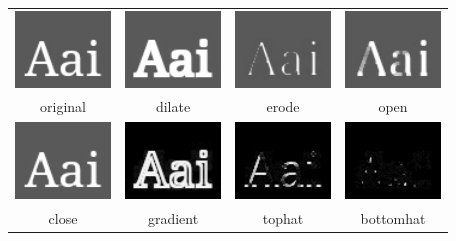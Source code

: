 \begin{tabular}{cccc}
\includegraphics[width=1.0in]{figures/morphsource.jpg} &
\includegraphics[width=1.0in]{figures/dilate.jpg} &
\includegraphics[width=1.0in]{figures/erode.jpg} &
\includegraphics[width=1.0in]{figures/morphopen.jpg} \\
original & dilate & erode & open \\[2.0ex]
\includegraphics[width=1.0in]{figures/morphclose.jpg} &
\includegraphics[width=1.0in]{figures/morphgradient.jpg} &
\includegraphics[width=1.0in]{figures/tophat.jpg} &
\includegraphics[width=1.0in]{figures/bottomhat.jpg} \\
close & gradient & tophat & bottomhat \\
\end{tabular}

